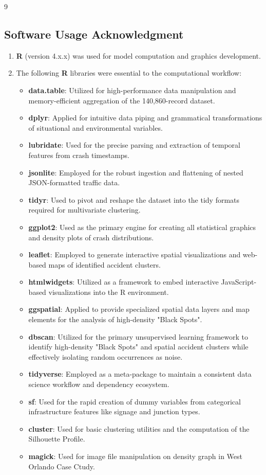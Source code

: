 \documentclass[conference]{IEEEtran}
\begin{document}
\begin{thebibliography}{9}
\subsection*{Software Usage Acknowledgment}
\begin{enumerate}
	\item \textbf{R} (version 4.x.x) was used for model computation and graphics development.
	\item The following \textbf{R} libraries were essential to the computational workflow:
\begin{itemize}
	\item \textbf{data.table}: Utilized for high-performance data manipulation and memory-efficient aggregation of the 140,860-record dataset.
	\item \textbf{dplyr}: Applied for intuitive data piping and grammatical transformations of situational and environmental variables.
	\item \textbf{lubridate}: Used for the precise parsing and extraction of temporal features from crash timestamps.
	\item \textbf{jsonlite}: Employed for the robust ingestion and flattening of nested JSON-formatted traffic data.
	\item \textbf{tidyr}: Used to pivot and reshape the dataset into the tidy formats required for multivariate clustering.
	\item \textbf{ggplot2}: Used as the primary engine for creating all statistical graphics and density plots of crash distributions.
	\item \textbf{leaflet}: Employed to generate interactive spatial visualizations and web-based maps of identified accident clusters.
	\item \textbf{htmlwidgets}: Utilized as a framework to embed interactive JavaScript-based visualizations into the R environment.
	\item \textbf{ggspatial}: Applied to provide specialized spatial data layers and map elements for the analysis of high-density "Black Spots".
	\item \textbf{dbscan}: Utilized for the primary unsupervised learning framework to identify high-density "Black Spots" and spatial accident clusters while effectively isolating random occurrences as noise.
	\item \textbf{tidyverse}: Employed as a meta-package to maintain a consistent data science workflow and dependency ecosystem.
	\item \textbf{sf}: Used for the rapid creation of dummy variables from categorical infrastructure features like signage and junction types.
	\item \textbf{cluster}: Used for basic clustering utilities and the computation of the Silhouette Profile.
	\item \textbf{magick}: Used for image file manipulation on density graph in West Orlando Case Ctudy.

\end{itemize}
\end{enumerate}

	
\end{thebibliography}

\vspace{12pt}
\end{document}
